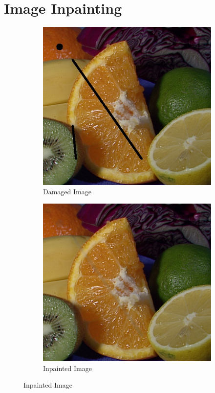 \documentclass{article}
\begin{document}
\section{Image Inpainting}
\begin{figure}[!ht]
\begin{subfigure}{0.5\textwidth}
\centering
\includegraphics[width=0.75\linewidth]{fruits_damaged.jpg}
\caption{Damaged Image}
\end{subfigure}
\begin{subfigure}{0.5\textwidth}
\centering
\includegraphics[width=0.75\linewidth]{fruits_painted.png}
\caption{Inpainted Image}
\end{subfigure}
\end{figure}
\clearpage
\end{document}

